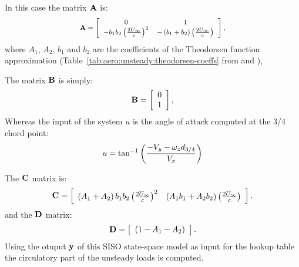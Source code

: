 In this case the matrix $\bm{\mathbf{A}}$ is:
\begin{equation}
	\footnotesize
	\bm{\mathbf{A}} = \left[
		\begin{array}{cc}
		0 & 1 \\
		-b_1 b_2 \left(  \frac{2U_\infty}{c} \right)^2 & -\left(  b_1 + b_2 \right) \left( \frac{2 U_\infty}{c} \right)
		\end{array}
		\right],
\end{equation}
where $A_1$, $A_2$, $b_1$ and $b_2$ are the coefficients of the Theodorsen
function approximation (Table~\ref{tab:aero:unsteady:theodorsen-coeffs}
from \cite{BIELAWA92} and \cite{LEISHMAN-2006}),

The matrix $\bm{\mathbf{B}}$ is simply:
\begin{equation}
	\bm{\mathbf{B}} = \left[
		\begin{array}{c}
			0  \\
			1 
		\end{array}
		\right],
\end{equation}
Whereas the input of the system $u$ is the angle of attack computed
at the 3/4 chord point:
\begin{equation}
	u = \tan^{-1} \left(  \frac{-V_y - \omega_z d_{3/4}}{V_x} \right)
\end{equation}

The $\bm{\mathbf{C}}$ matrix is:
\begin{equation}
	\bm{\mathbf{C}} = \left[
		\begin{array}{cc}
		\left(A_1+A_2\right)b_1 b_2 \left( \frac{2 U_\infty}{c}\right)^2 &
		 \left(A_1  b_1 + A_2 b_2 \right) \left( \frac{2 U_\infty}{c}\right) 
		\end{array}
		\right].
\end{equation}
and the $\bm{\mathbf{D}}$ matrix:
\begin{equation}
	\bm{\mathbf{D}} = \left[
		\begin{array}{cc}
		\left( 1 -A_1 - A_2 \right) 
		\end{array}
		\right].
\end{equation}
Using the otuput $\bm{\mathbf{y}}$ of this SISO state-space model as input 
for the lookup table the circulatory part of the unsteady loads is
computed.

